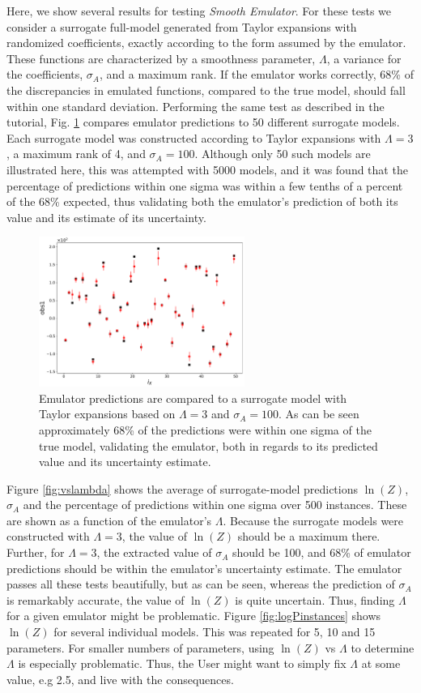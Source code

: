 \documentclass[UserManual.tex]{subfiles}
\begin{document}
Here, we show several results for testing {\it Smooth Emulator}. For these tests we consider a surrogate full-model generated from Taylor expansions with randomized coefficients, exactly according to the form assumed by the emulator. These functions are characterized by a smoothness parameter, $\Lambda$, a variance for the coefficients, $\sigma_A$, and a maximum rank. If the emulator works correctly, 68\% of the discrepancies in emulated functions, compared to the true model, should fall within one standard deviation. Performing the same test as described in the tutorial, Fig. \ref{fig:smoothtest_vsfullmodel} compares emulator predictions to 50 different surrogate models. Each surrogate model was constructed according to Taylor expansions with $\Lambda=3$, a maximum rank of 4, and $\sigma_A=100$. Although only 50 such models are illustrated here, this was attempted with 5000 models, and it was found that the percentage of predictions within one sigma was within a few tenths of a percent of the 68\% expected, thus validating both the emulator's prediction of both its value and its estimate of its uncertainty.
\begin{figure}
\centerline{\includegraphics[width=0.6\textwidth]{YvsY_smooth}}
\caption{\label{fig:smoothtest_vsfullmodel}
Emulator predictions are compared to a surrogate model with Taylor expansions based on $\Lambda=3$ and $\sigma_A=100$. As can be seen approximately 68\% of the predictions were within one sigma of the true model, validating the emulator, both in regards to its predicted value and its uncertainty estimate.}
\end{figure}

Figure \ref{fig:vslambda} shows the average of surrogate-model predictions $\ln(Z)$, $\sigma_A$ and the percentage of predictions within one sigma over 500 instances. These are shown as a function of the emulator's $\Lambda$. Because the surrogate models were constructed with $\Lambda=3$, the value of $\ln(Z)$ should be a maximum there. Further, for $\Lambda=3$, the extracted value of $\sigma_A$ should be 100, and 68\% of emulator predictions should be within the emulator's uncertainty estimate. The emulator passes all these tests beautifully, but as can be seen, whereas the prediction of $\sigma_A$ is remarkably accurate, the value of $\ln(Z)$ is quite uncertain. Thus, finding $\Lambda$ for a given emulator might be problematic. Figure \ref{fig:logPinstances} shows $\ln(Z)$ for several individual models. This was repeated for 5, 10 and 15 parameters. For smaller numbers of parameters, using $\ln(Z)$ vs $\Lambda$ to determine $\Lambda$  is especially problematic. Thus, the User might want to simply fix $\Lambda$ at some value, e.g 2.5, and live with the consequences.
\end{document}
